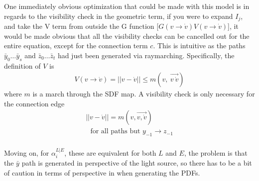 \message{ !name(test.tex)}\documentclass{article}
\begin{document}
    One immediately obvious optimization that could be made with this model is
    in regards to the visibility check in the geometric term, if you were to
    expand $I_j$, and take the V term from outside the G function
    [$G(v \rightarrow
    \dot{v}) V(v \rightarrow \dot{v})$],
    it would be made obvious that all the visibility checks can be
    cancelled out for the entire equation, except for the connection term $c$.
    This is intuitive as the paths
    $\bar{y}_{0} \ldots \bar{y}_s$ and $\bar{z}_0 \ldots \bar{z}_t$ had just been generated via raymarching.
    Specifically, the definition of $V$ is
  \begin{align}
    V(v \rightarrow \dot{v}) = ||v - \dot{v}|| \leq
    m(v,\:\overrightarrow{v\:\dot{v}})
  \end{align}
    where $m$ is a march through the SDF map. A visibility check is only
    necessary for the connection edge
    \begin{align*}
      ||v - \dot{v}|| = m(v, \overrightarrow{v, \dot{v}})\\
      \:\:\:\text{for all paths but } y_{-1} \rightarrow z_{-1} 
    \end{align*}
\\
    Moving on, for $\alpha^{L|E}_i$, these are equivalent for both $L$ and $E$,
    the problem is that the $\bar{y}$ path is generated in perspective of the
    light source, so there has to be a bit of caution in terms of perspective in when generating the PDFs.
    
\end{document}

